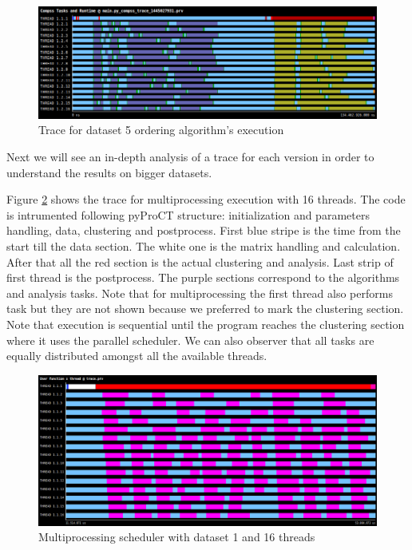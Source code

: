 \begin{figure}[h]
\includegraphics[width=\textwidth]{traces/compss_2_small_order.png}
\caption{Trace for dataset 5 ordering algorithm's execution}
\label{fig:small_trace_order}
\end{figure}

Next we will see an in-depth analysis of a trace for each version in order to understand the results on bigger datasets.

Figure \ref{tra:par16small} shows the trace for multiprocessing execution with 16 threads. The code is intrumented following pyProCT structure: initialization and parameters handling, data, clustering and postprocess. First blue stripe is the time from the start till the data section. The white one is the matrix handling and calculation. After that all the red section is the actual clustering and analysis. Last strip of first thread is the postprocess. The purple sections correspond to the algorithms and analysis tasks. Note that for multiprocessing the first thread also performs task but they are not shown because we preferred to mark the clustering section. Note that execution is sequential until the program reaches the clustering section where it uses the parallel scheduler. We can also observer that all tasks are equally distributed amongst all the available threads. 

\begin{figure}[h]
\includegraphics[width=\textwidth]{traces/par_16_small.png}
\caption{Multiprocessing scheduler with dataset 1 and 16 threads}
\label{tra:par16small}
\end{figure}

